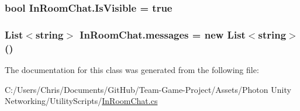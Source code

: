 \subsubsection[{\texorpdfstring{Is\+Visible}{IsVisible}}]{\setlength{\rightskip}{0pt plus 5cm}bool In\+Room\+Chat.\+Is\+Visible = true}\hypertarget{class_in_room_chat_adbfef915a36e98692020697a6cacfca6}{}\label{class_in_room_chat_adbfef915a36e98692020697a6cacfca6}
\subsubsection[{\texorpdfstring{messages}{messages}}]{\setlength{\rightskip}{0pt plus 5cm}List$<$string$>$ In\+Room\+Chat.\+messages = new List$<$string$>$()}\hypertarget{class_in_room_chat_aaf95335cf66ac85905d13191dd5da780}{}\label{class_in_room_chat_aaf95335cf66ac85905d13191dd5da780}


The documentation for this class was generated from the following file\+:\begin{DoxyCompactItemize}
\item 
C\+:/\+Users/\+Chris/\+Documents/\+Git\+Hub/\+Team-\/\+Game-\/\+Project/\+Assets/\+Photon Unity Networking/\+Utility\+Scripts/\hyperlink{_in_room_chat_8cs}{In\+Room\+Chat.\+cs}\end{DoxyCompactItemize}
